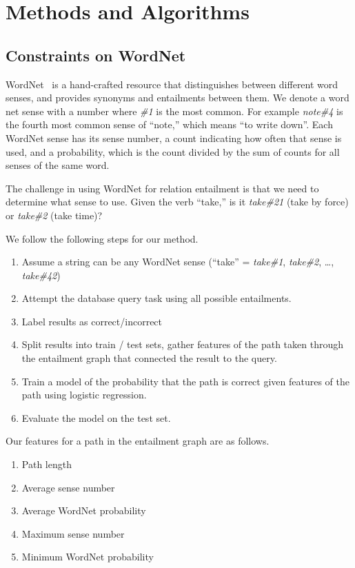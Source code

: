 \documentclass{article}
\begin{document}
\section{Methods and Algorithms}

\subsection{Constraints on WordNet}

WordNet~\cite{fellbaum98wordnet} is a hand-crafted resource that
distinguishes between different word senses, and provides synonyms and
entailments between them. We denote a word net sense with a number where \textit{\#1} is the most common. For example \textit{note\#4} is the fourth most common sense of ``note,'' which means ``to write down''. Each WordNet sense has its sense number, a count indicating how often that sense is used, and a probability, which is the count divided by the sum of counts for all senses of the same word.

The challenge in using WordNet for relation entailment is that we need to determine what sense to use. Given the verb ``take,'' is it \textit{take\#21} (take by force) or \textit{take\#2} (take time)?

We follow the following steps for our method.

\begin{enumerate}
\item Assume a string can be any WordNet sense (``take'' = \textit{take\#1}, \textit{take\#2}, \ldots, \textit{take\#42})
\item Attempt the database query task using all possible entailments.
\item Label results as correct/incorrect
\item Split results into train / test sets, gather features of the path taken through the entailment graph that connected the result to the query.
\item Train a model of the probability that the path is correct given features of the path using
logistic regression.
\item Evaluate the model on the test set.
\end{enumerate}

Our features for a path in the entailment graph are as follows.
\begin{enumerate}
\item Path length
\item Average sense number
\item Average WordNet probability
\item Maximum sense number
\item Minimum WordNet probability
\end{enumerate}
\end{document}
